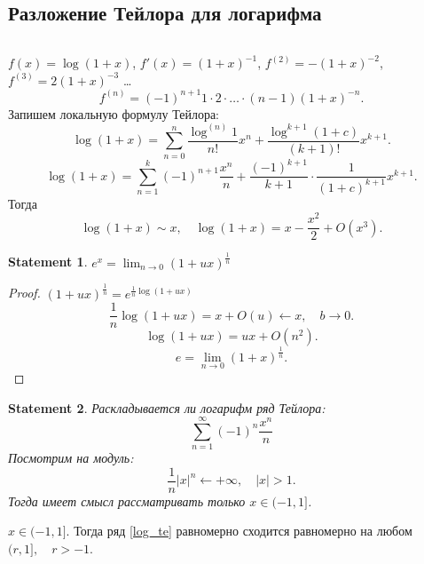 \documentclass[11pt]{book}
\theoremstyle{definition}
\theoremstyle{plain}
\theoremstyle{plain}
\newtheorem*{st}{Statement}
\theoremstyle{definition}
\theoremstyle{remark}
\begin{document}
\subsection{Разложение Тейлора для логарифма}
\begin{thm}
    $ $

    $ f(x) = \log(1+x)$, $ f'(x) = (1+x) ^{-1}$, $ f^{(2)} = -(1+x)^{-2}$, $ f^{(3)} = 2 (1+x) ^{ -3}$ \ldots
    \[
	f^{(n)} = (-1)^{n+1} 1 \cdot  2\cdot  \ldots \cdot (n-1) (1+x) ^{-n}
    .\]
    Запишем локальную формулу Тейлора:
    \[
	\log(1+x)=\sum_{n=0}^{n}\frac{\log^{(n)} 1}{n!} x^{n} + \frac{\log^{k+1} (1 + c)}{(k+1)!} x ^{ k+1}
    .\]
    \[
	\log(1+x) = \sum_{n=1} ^{k}  (-1)^{n+1} \frac{x^{n}}{n} + \frac{(-1)^{ k+1}}{k+1}\cdot  \frac{1}{(1+c)^{k+1}}x ^{ k+1}
    .\]
    Тогда
    \[
	\log(1+x) \sim x, \quad \log(1+x) = x - \frac{x^2}{2} + O(x^3)
    .\]
\end{thm}
\begin{st}
    $ e^{x} = \lim_{n \to 0}  (1 + ux) ^{ \frac{1}{n}}$
\end{st}
\begin{proof}
    $ (1+ux)^{\frac{1}{n}} = e ^{ \frac{1}{n}\log(1+ux)}$
    \[
	\frac{1}{n} \log (1+ux) = x + O(u) \longleftarrow  x, \quad b \to  0
    .\]
    \[
	\log(1+ux) = ux + O(n^2)
    .\]
    \[
	e = \lim_{n \to  0} (1+x) ^{\frac{1}{n}}
    .\]
\end{proof}
\begin{st}
    Раскладывается ли логарифм  ряд Тейлора:
    \begin{equation}\label{log_te}
	\sum_{n=1} ^{\infty} (-1)^{ n} \frac{x^{n}}{n}
    \end{equation}
    Посмотрим на модуль:
    \[
	\frac{1}{n} |x|^{n} \longleftarrow +\infty, \quad | x | > 1
    .\]
    Тогда имеет смысл рассматривать только $ x\in (-1, 1]$.
\end{st}
\begin{thm}
    $ x \in (-1, 1]$. Тогда ряд \ref{log_te} равномерно сходится равномерно  на любом $ (r , 1], \quad r>-1$.
\end{thm}
\end{document}
